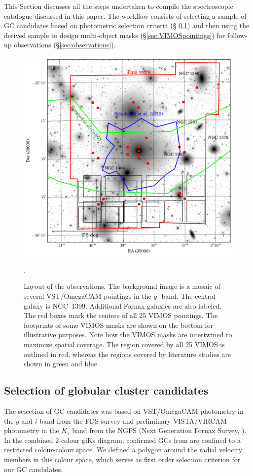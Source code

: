 \documentclass[useAMS,usenatbib]{mn2e}
\begin{document}
This Section discusses all the steps undertaken to compile the spectroscopic 
catalogue discussed in this paper. The 
workflow consists of selecting a sample of GC candidates based on photometric 
selection criteria (\S 
\ref{sec:selectionGC}) and then using the derived sample to design multi-object 
masks (\S \ref{sec:VIMOSpointings}) for follow-up 
observations (\S \ref{sec:observations}).

\begin{figure}
\centering
\includegraphics[scale=0.7]{figures/fov.png} 
\caption{Layout of the observations. The background image is a mosaic of 
several VST/OmegaCAM pointings in the $g$-
band. The central galaxy is NGC~1399. Additional Fornax galaxies are also 
labeled. The red boxes mark the centers of all 
25 VIMOS pointings. The footprints of some VIMOS masks are shown on the bottom 
for illustrative purposes. Note how 
the VIMOS masks are intertwined to maximize spatial coverage. The region 
covered by all 25 VIMOS is outlined in red, 
whereas the regions covered by literature studies are shown in green 
\citep{Bergond07} and blue \citep{Schuberth}}.
\label{fig:fov}
\end{figure}

\subsection{Selection of globular cluster candidates}
\label{sec:selectionGC}
The selection of GC candidates was based on VST/OmegaCAM photometry in the $g$ 
and $i$ band from the FDS survey \citep{DAbrusco16,Iodice16} and preliminary 
VISTA/VIRCAM photometry in the $K_s$ band from the NGFS (Next 
Generation Fornax Survey, \citealt{Munoz14}). 
In the combined 2-colour giKs diagram, confirmed GCs from \citet{Schuberth}
are confined to a restricted colour-colour space. We defined a polygon around 
the radial velocity members in this colour space, which serves as first order 
selection criterion for our GC candidates. 
\end{document}
